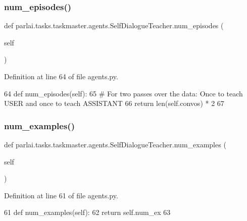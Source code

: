 \subsubsection{\texorpdfstring{num\+\_\+episodes()}{num\_episodes()}}
{\footnotesize\ttfamily def parlai.\+tasks.\+taskmaster.\+agents.\+Self\+Dialogue\+Teacher.\+num\+\_\+episodes (\begin{DoxyParamCaption}\item[{}]{self }\end{DoxyParamCaption})}



Definition at line 64 of file agents.\+py.


\begin{DoxyCode}
64     \textcolor{keyword}{def }num\_episodes(self):
65         \textcolor{comment}{# For two passes over the data: Once to teach USER and once to teach ASSISTANT}
66         \textcolor{keywordflow}{return} len(self.convos) * 2
67 
\end{DoxyCode}
\mbox{\label{classparlai_1_1tasks_1_1taskmaster_1_1agents_1_1SelfDialogueTeacher_a9a9b363b5269135be19a3d6607e4bc07}} 
\subsubsection{\texorpdfstring{num\+\_\+examples()}{num\_examples()}}
{\footnotesize\ttfamily def parlai.\+tasks.\+taskmaster.\+agents.\+Self\+Dialogue\+Teacher.\+num\+\_\+examples (\begin{DoxyParamCaption}\item[{}]{self }\end{DoxyParamCaption})}



Definition at line 61 of file agents.\+py.


\begin{DoxyCode}
61     \textcolor{keyword}{def }num\_examples(self):
62         \textcolor{keywordflow}{return} self.num\_ex
63 
\end{DoxyCode}


